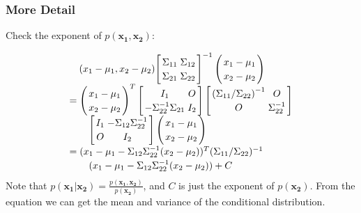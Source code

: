 \documentclass{beamer}
\begin{document}
\begin{frame}
	\frametitle{More Detail}
	Check the exponent of $p(\bm{x_1, x_2})$:
	
\[\arraycolsep=1.4pt\def\arraystretch{1.2}
\begin{array}{l}
\quad ({x_1} - {\mu _1},{x_2} - {\mu _2}){\left[ {\begin{array}{*{20}{c}}
		{{\Sigma _{11}}}&{{\Sigma _{12}}}\\
		{{\Sigma _{21}}}&{{\Sigma _{22}}}
		\end{array}} \right]^{ - 1}}\left( {\begin{array}{*{20}{c}}
	{{x_1} - {\mu _1}}\\
	{{x_2} - {\mu _2}}
	\end{array}} \right)\\
= {\left( {\begin{array}{*{20}{c}}
		{{x_1} - {\mu _1}}\\
		{{x_2} - {\mu _2}}
		\end{array}} \right)^T}\left[ {\begin{array}{*{20}{c}}
	{{I_1}}&O\\
	{ - \Sigma _{22}^{ - 1}{\Sigma _{21}}}&{{I_2}}
	\end{array}} \right]\left[ {\begin{array}{*{20}{c}}
	{{{({\Sigma _{11}}/{\Sigma _{22}})}^{ - 1}}}&O\\
	O&{\Sigma _{22}^{ - 1}}
	\end{array}} \right]\\
\qquad \left[ {\begin{array}{*{20}{c}}
	{{I_1}}&{ - {\Sigma _{12}}\Sigma _{22}^{ - 1}}\\
	O&{{I_2}}
	\end{array}} \right]\left( {\begin{array}{*{20}{c}}
	{{x_1} - {\mu _1}}\\
	{{x_2} - {\mu _2}}
	\end{array}} \right)\\
	= {({x_1} - {\mu _1} - {\Sigma _{12}}\Sigma _{22}^{ - 1}({x_2} - {\mu _2}))^T}{({\Sigma _{11}}/{\Sigma _{22}})^{ - 1}}\\
\qquad({x_1} - {\mu _1} - {\Sigma _{12}}\Sigma _{22}^{ - 1}({x_2} - {\mu _2})) + C
	\end{array}
	\]
Note that $p(\bm{x_1|x_2}) = \frac{p(\bm{x_1, x_2})}{p(\bm{x_2})}$, and $C$ is just the exponent of $p(\bm{x_2})$. From the equation we can get the mean and variance of the conditional distribution.	
\end{frame}
	
\end{document}
